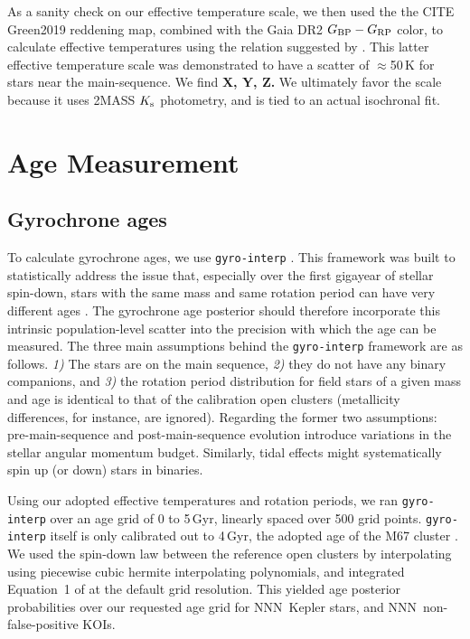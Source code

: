 \documentclass[11pt,twocolumn,tighten]{aastex63}
\newcommand{\nkepstarswithages}{NNN}
\newcommand{\nkoisnofpwithages}{NNN}
\begin{document}
As a sanity check on our effective temperature scale, we then used the 
the CITE Green2019 reddening map, combined with the Gaia DR2 $G_{\rm
BP}-G_{\rm RP}$ color, to calculate effective temperatures using the
relation suggested by \citet{Curtis_2020}.
This latter effective temperature scale was demonstrated to have a 
scatter of $\approx$50\,K for stars near the main-sequence.
We find {\bf X, Y, Z.}
We ultimately favor the \citet{Berger_2020a_catalog} scale
because it uses 2MASS $K_{\rm s}$ photometry, and is tied to an actual
isochronal fit.




\section{Age Measurement}
\label{sec:agemethod}

\subsection{Gyrochrone ages}
To calculate gyrochrone ages, we use \texttt{gyro-interp}
\citep{Bouma_2023}.  This framework was built to statistically address
the issue that, especially over the first gigayear of stellar
spin-down, stars with the same mass and same rotation period can have
very different ages \citep[e.g.][]{Curtis_2019_ngc6811}.  The
gyrochrone age posterior should therefore incorporate this intrinsic
population-level scatter into the precision with which the age can be
measured.  The three main assumptions behind the \texttt{gyro-interp}
framework are as follows.  {\it 1)} The stars are on the main
sequence, {\it 2)} they do not have any binary companions,
and {\it 3)} the rotation period distribution
for field stars of a given mass and age is identical to that of
the calibration open clusters (metallicity differences, for instance, are
ignored).  
Regarding the former two assumptions:
pre-main-sequence and post-main-sequence evolution introduce
variations in the stellar angular momentum budget.  Similarly, tidal
effects might systematically spin up (or down) stars in binaries.

Using our adopted effective temperatures and rotation periods, we ran 
\texttt{gyro-interp} over an age grid of 0 to 5\,Gyr, linearly spaced
over 500 grid points.
\texttt{gyro-interp} itself is only calibrated out to 4\,Gyr, the
adopted age of the M67 cluster \citep[see][]{Dungee_2022,Gruner_2023}.
We used the spin-down law between the reference open clusters by
interpolating using piecewise cubic hermite interpolating polynomials,
and integrated Equation~1 of \citep{Bouma_2023} at the default grid
resolution.
This yielded age posterior probabilities over our requested age grid
for \nkepstarswithages\ Kepler stars, and \nkoisnofpwithages\
non-false-positive KOIs.
\end{document}
